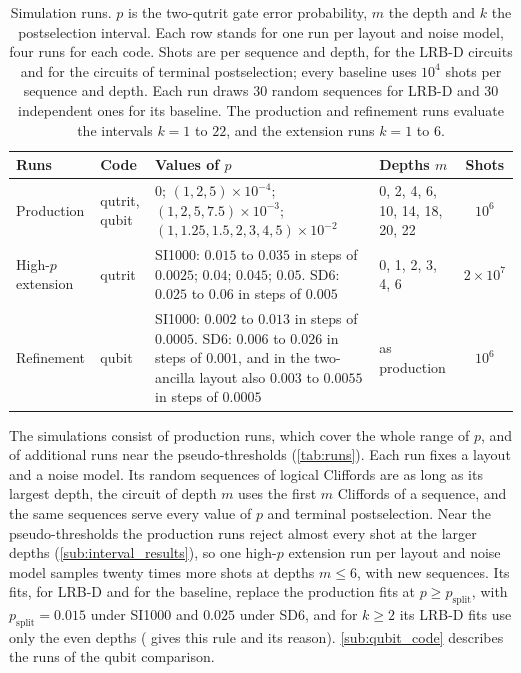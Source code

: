 \begin{table}[tp]
  \centering
  \small
  \begin{tabular}{l|l|p{6.0cm}|p{2.7cm}|c}
    \hline
    Runs & Code & Values of $p$ & Depths $m$ & Shots \\
    \hline
    Production & qutrit, qubit & $0$; $(1, 2, 5)\times10^{-4}$; $(1, 2, 5, 7.5)\times10^{-3}$; $(1, 1.25, 1.5, 2, 3, 4, 5)\times10^{-2}$ & 0, 2, 4, 6, 10, 14, 18, 20, 22 & $10^6$ \\
    High-$p$ extension & qutrit & SI1000: $0.015$ to $0.035$ in steps of $0.0025$; $0.04$; $0.045$; $0.05$. SD6: $0.025$ to $0.06$ in steps of $0.005$ & 0, 1, 2, 3, 4, 6 & $2\times10^7$ \\
    Refinement & qubit & SI1000: $0.002$ to $0.013$ in steps of $0.0005$. SD6: $0.006$ to $0.026$ in steps of $0.001$, and in the two-ancilla layout also $0.003$ to $0.0055$ in steps of $0.0005$ & as production & $10^6$ \\
    \hline
  \end{tabular}
  \caption{Simulation runs. $p$ is the two-qutrit gate error probability, $m$ the depth and $k$ the postselection interval. Each row stands for one run per layout and noise model, four runs for each code. Shots are per sequence and depth, for the LRB-D circuits and for the circuits of terminal postselection; every baseline uses $10^4$ shots per sequence and depth. Each run draws 30 random sequences for LRB-D and 30 independent ones for its baseline. The production and refinement runs evaluate the intervals $k = 1$ to $22$, and the extension runs $k = 1$ to $6$.}
  \label{tab:runs}
\end{table}

The simulations consist of production runs, which cover the whole range of $p$, and of additional runs near the pseudo-thresholds (\autoref{tab:runs}). Each run fixes a layout and a noise model. Its random sequences of logical Cliffords are as long as its largest depth, the circuit of depth $m$ uses the first $m$ Cliffords of a sequence, and the same sequences serve every value of $p$ and terminal postselection. Near the pseudo-thresholds the production runs reject almost every shot at the larger depths (\autoref{sub:interval_results}), so one high-$p$ extension run per layout and noise model samples twenty times more shots at depths $m \le 6$, with new sequences. Its fits, for LRB-D and for the baseline, replace the production fits at $p \ge p_{\mathrm{split}}$, with $p_{\mathrm{split}} = 0.015$ under SI1000 and $0.025$ under SD6, and for $k \ge 2$ its LRB-D fits use only the even depths ( gives this rule and its reason). \autoref{sub:qubit_code} describes the runs of the qubit comparison.
